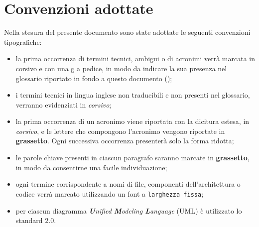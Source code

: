 \section{Convenzioni adottate}
Nella stesura del presente documento sono state adottate le seguenti convenzioni
tipografiche:
\begin{itemize}
	\item la prima occorrenza di termini tecnici, ambigui o di acronimi verrà marcata in corsivo	e con una g a pedice, in modo da indicare la sua presenza nel glossario riportato in fondo a questo documento ();
	\item i termini tecnici in lingua inglese non traducibili e non presenti nel glossario, verranno evidenziati in \emph{corsivo};
	\item la prima occorrenza di un acronimo viene riportata con la dicitura estesa, in
	\emph{corsivo}, e le lettere che compongono l’acronimo vengono riportate in \textbf{grassetto}. Ogni successiva occorrenza presenterà solo la forma ridotta;
	\item le parole chiave presenti in ciascun paragrafo saranno marcate in \textbf{grassetto}, in modo da consentirne una facile individuazione;
	\item ogni termine corrispondente a nomi di file, componenti dell’architettura o codice verrà marcato utilizzando un font a \texttt{larghezza fissa};
	\item per ciascun diagramma \emph{\textbf{U}nified \textbf{M}odeling \textbf{L}anguage} (\acrshort{UML}) è utilizzato lo standard 2.0.
\end{itemize}
